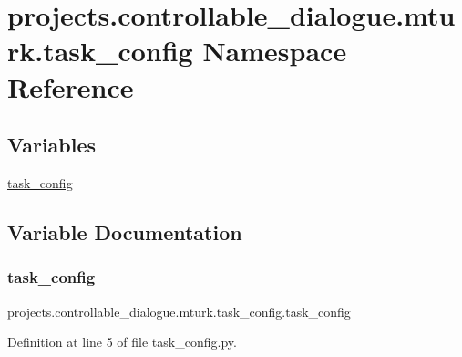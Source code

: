 \hypertarget{namespaceprojects_1_1controllable__dialogue_1_1mturk_1_1task__config}{}\section{projects.\+controllable\+\_\+dialogue.\+mturk.\+task\+\_\+config Namespace Reference}
\label{namespaceprojects_1_1controllable__dialogue_1_1mturk_1_1task__config}
\subsection*{Variables}
\begin{DoxyCompactItemize}
\item 
\hyperlink{namespaceprojects_1_1controllable__dialogue_1_1mturk_1_1task__config_a02846a9f8d649721a33673c0876b53a9}{task\+\_\+config}
\end{DoxyCompactItemize}


\subsection{Variable Documentation}
\mbox{\label{namespaceprojects_1_1controllable__dialogue_1_1mturk_1_1task__config_a02846a9f8d649721a33673c0876b53a9}} 
\subsubsection{\texorpdfstring{task\+\_\+config}{task\_config}}
{\footnotesize\ttfamily projects.\+controllable\+\_\+dialogue.\+mturk.\+task\+\_\+config.\+task\+\_\+config}



Definition at line 5 of file task\+\_\+config.\+py.

